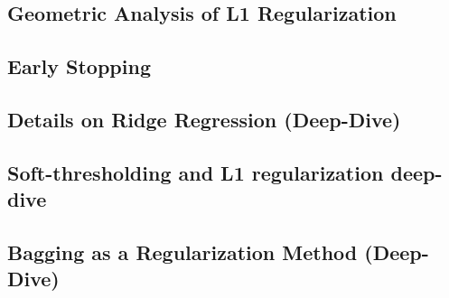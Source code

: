 \subsection{Geometric Analysis of L1 Regularization}


\subsection{Early Stopping}


\subsection{Details on Ridge Regression (Deep-Dive)}


\subsection{Soft-thresholding and L1 regularization deep-dive}


\subsection{Bagging as a Regularization Method (Deep-Dive)}







